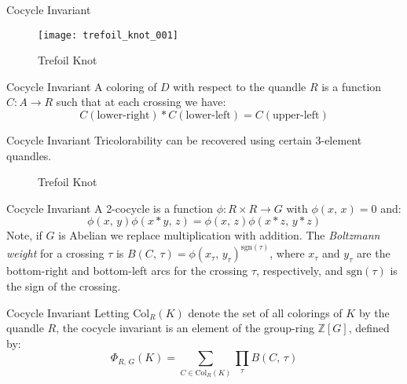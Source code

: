 \documentclass{beamer}
\begin{document}
    \begin{frame}{Cocycle Invariant}
        \begin{figure}
            \centering
            \texttt{[image: trefoil\_knot\_001]}
            \caption{Trefoil Knot}
        \end{figure}
    \end{frame}
    \begin{frame}{Cocycle Invariant}
        A coloring of $D$ with respect to the quandle $R$ is a function
        $C:A\rightarrow{R}$ such that at each crossing we have:
        \begin{equation}
            C(\textrm{lower-right})*C(\textrm{lower-left})
            =C(\textrm{upper-left})
        \end{equation}
    \end{frame}
    \begin{frame}{Cocycle Invariant}
        Tricolorability can be recovered using certain 3-element quandles.
        \begin{figure}
            \centering
            \caption{Trefoil Knot}
        \end{figure}
    \end{frame}
    \begin{frame}{Cocycle Invariant}
        A 2-cocycle is a function
        $\phi:R\times{R}\rightarrow{G}$ with $\phi(x,\,x)=0$ and:
        \begin{equation}
            \phi(x,\,y)\phi(x*y,\,z)=\phi(x,\,z)\phi(x*z,\,y*z)
        \end{equation}
        Note, if $G$ is Abelian we replace multiplication with addition.
        The \textit{Boltzmann weight} for a crossing $\tau$ is
        $B(C,\,\tau)=\phi(x_{\tau},\,y_{\tau})^{\textrm{sgn}(\tau)}$,
        where $x_{\tau}$ and $y_{\tau}$ are the bottom-right and bottom-left
        arcs for the crossing $\tau$, respectively, and
        $\textrm{sgn}(\tau)$ is the sign of the crossing.
    \end{frame}
    \begin{frame}{Cocycle Invariant}
        Letting $\textrm{Col}_{R}(K)$ denote the set of all colorings of $K$
        by the quandle $R$, the cocycle invariant is an element of the
        group-ring $\mathbb{Z}[G]$, defined by:
        \begin{equation}
            \Phi_{R,\,G}(K)
            =\sum_{C\in\textrm{Col}_{R}(K)}\prod_{\tau}B(C,\,\tau)
        \end{equation}
    \end{frame}
\end{document}
